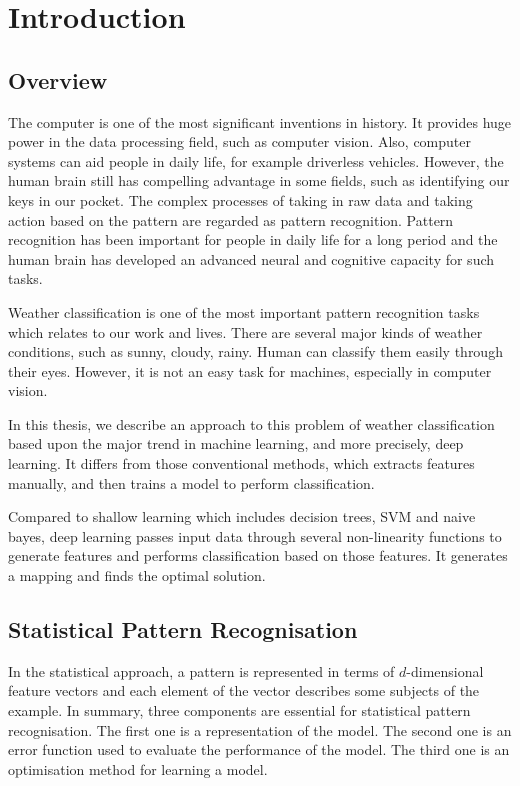 \chapter{Introduction} %
\label{Chapter1}


\section{Overview}

The computer is one of the most significant inventions in history. It provides huge power in the data processing field, such as computer vision. Also, computer systems can aid people in daily life, for example driverless vehicles. However, the human brain still has compelling advantage in some fields, such as identifying our keys in our pocket. The complex processes of taking in raw data and taking action based on the pattern are regarded as pattern recognition. Pattern recognition has been important for people in daily life for a long period and the human brain has developed an advanced neural and cognitive capacity for such tasks.

Weather classification is one of the most important pattern recognition tasks which relates to our work and lives. There are several major kinds of weather conditions, such as sunny, cloudy, rainy. Human can classify them easily through their eyes. However, it is not an easy task for machines, especially in computer vision. 

In this thesis, we describe an approach to this problem of weather classification based upon the major trend in machine learning, and more precisely, deep learning. It differs from those conventional methods, which extracts features manually, and then trains a model to perform classification.

Compared to shallow learning which includes decision trees, SVM and naive bayes, deep learning passes input data through several non-linearity functions to generate features and performs classification based on those features. It generates a mapping and finds the optimal solution.

\section{Statistical Pattern Recognisation}

In the statistical approach, a pattern is represented in terms of $d$-dimensional feature vectors and each element of the vector describes some subjects of the example. In summary, three components are essential for statistical pattern recognisation. The first one is a representation of the model. The second one is an error function used to evaluate the performance of the model. The third one is an optimisation method for learning a model.

